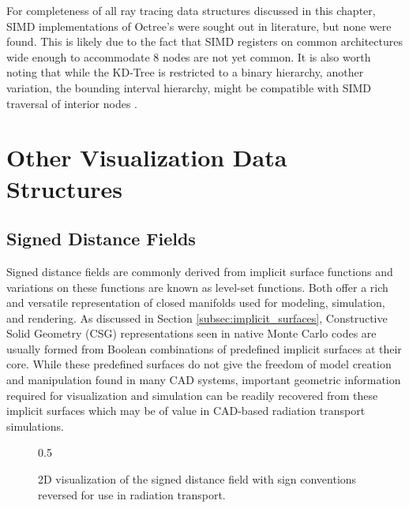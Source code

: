 For completeness of all ray tracing data structures discussed in this chapter,
SIMD implementations of Octree's were sought out in literature, but none were
found. This is likely due to the fact that SIMD registers on common
architectures wide enough to accommodate 8 nodes are not yet common. It is also
worth noting that while the KD-Tree is restricted to a binary hierarchy, another
variation, the bounding interval hierarchy, might be compatible with SIMD
traversal of interior nodes \cite{Watcher_2006}.

\section{Other Visualization Data Structures}

\subsection{Signed Distance Fields}

Signed distance fields are commonly derived from implicit surface functions and
variations on these functions are known as level-set functions. Both offer a
rich and versatile representation of closed manifolds used for modeling,
simulation, and rendering. As discussed in Section
\ref{subsec:implicit_surfaces}, Constructive Solid Geometry (CSG)
representations seen in native Monte Carlo codes are usually formed from Boolean
combinations of predefined implicit surfaces at their core. While these
predefined surfaces do not give the freedom of model creation and manipulation
found in many CAD systems, important geometric information required for
visualization and simulation can be readily recovered from these implicit
surfaces which may be of value in CAD-based radiation transport simulations.

\begin{figure}[H]
  {0.5\textwidth}
  \centering
  \caption{2D visualization of the signed distance field with sign conventions
    reversed for use in radiation transport.}
  \label{fig:preconditioner_datastruct}
\end{figure}



